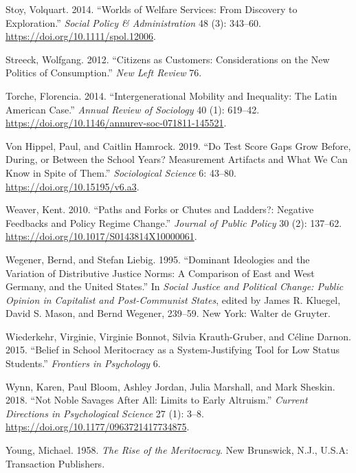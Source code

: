 \documentclass[
  letterpaper,
  DIV=11,
  numbers=noendperiod]{scrartcl}
\newlength{\cslhangindent}
\newenvironment{CSLReferences}[2] %
 {\begin{list}{}{%
  \setlength{\itemindent}{0pt}
  \setlength{\leftmargin}{0pt}
  \setlength{\parsep}{0pt}
  \ifodd #1
   \setlength{\leftmargin}{\cslhangindent}
   \setlength{\itemindent}{-1\cslhangindent}
  \fi
  \setlength{\itemsep}{#2\baselineskip}}}
 {\end{list}}
\begin{document}
\begin{CSLReferences}{1}{0}
Stoy, Volquart. 2014. {``Worlds of {Welfare Services}: {From Discovery}
to {Exploration}.''} \emph{Social Policy \& Administration} 48 (3):
343--60. \url{https://doi.org/10.1111/spol.12006}.

Streeck, Wolfgang. 2012. {``Citizens as {Customers}: {Considerations} on
the {New Politics} of {Consumption}.''} \emph{New Left Review} 76.

Torche, Florencia. 2014. {``Intergenerational {Mobility} and
{Inequality}: {The Latin American Case}.''} \emph{Annual Review of
Sociology} 40 (1): 619--42.
\url{https://doi.org/10.1146/annurev-soc-071811-145521}.

Von Hippel, Paul, and Caitlin Hamrock. 2019. {``Do {Test Score Gaps
Grow} Before, During, or Between the {School Years}? {Measurement
Artifacts} and {What We Can Know} in {Spite} of {Them}.''}
\emph{Sociological Science} 6: 43--80.
\url{https://doi.org/10.15195/v6.a3}.

Weaver, Kent. 2010. {``Paths and {Forks} or {Chutes} and {Ladders}?:
{Negative Feedbacks} and {Policy Regime Change}.''} \emph{Journal of
Public Policy} 30 (2): 137--62.
\url{https://doi.org/10.1017/S0143814X10000061}.

Wegener, Bernd, and Stefan Liebig. 1995. {``Dominant {Ideologies} and
the {Variation} of {Distributive Justice Norms}: {A Comparison} of
{East} and {West Germany}, and the {United States}.''} In \emph{Social
{Justice} and {Political Change}: {Public Opinion} in {Capitalist} and
{Post-Communist States}}, edited by James R. Kluegel, David S. Mason,
and Bernd Wegener, 239--59. New York: Walter de Gruyter.

Wiederkehr, Virginie, Virginie Bonnot, Silvia Krauth-Gruber, and Céline
Darnon. 2015. {``Belief in School Meritocracy as a System-Justifying
Tool for Low Status Students.''} \emph{Frontiers in Psychology} 6.

Wynn, Karen, Paul Bloom, Ashley Jordan, Julia Marshall, and Mark
Sheskin. 2018. {``Not {Noble Savages After All}: {Limits} to {Early
Altruism}.''} \emph{Current Directions in Psychological Science} 27 (1):
3--8. \url{https://doi.org/10.1177/0963721417734875}.

Young, Michael. 1958. \emph{The Rise of the Meritocracy}. New Brunswick,
N.J., U.S.A: Transaction Publishers.

\end{CSLReferences}
\end{document}
